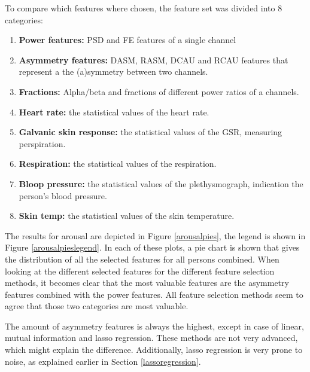To compare which features where chosen, the feature set was divided into 8 categories:
\begin{enumerate}
\item \textbf{Power features:} PSD and FE features of a single channel
\item \textbf{Asymmetry features:} DASM, RASM, DCAU and RCAU features that represent a the (a)symmetry between two channels.
\item \textbf{Fractions:} Alpha/beta and fractions of different power ratios of a channels.

\item \textbf{Heart rate:} the statistical values of the heart rate.
\item \textbf{Galvanic skin response:} the statistical values of the GSR, measuring perspiration.
\item \textbf{Respiration:} the statistical values of the respiration.
\item \textbf{Bloop pressure:} the statistical values of the plethysmograph, indication the person's blood pressure.
\item \textbf{Skin temp:} the statistical values of the skin temperature.
\end{enumerate} 

The results for arousal are depicted in Figure \ref{arousalpies}, the legend is shown in Figure \ref{arousalpieslegend}. In each of these plots, a pie chart is shown that gives the distribution of all the selected features for all persons combined. When looking at the different selected features for the different feature selection methods, it becomes clear that the most valuable features are the asymmetry features combined with the power features. All feature selection methods seem to agree that those two categories are most valuable.

\npar

The amount of asymmetry features is always the highest, except in case of linear, mutual information and lasso regression. These methods are not very advanced, which might explain the difference. Additionally, lasso regression is very prone to noise, as explained earlier in Section \ref{lassoregression}. 

\npar

